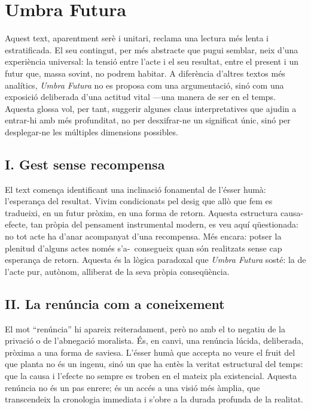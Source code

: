 \section*{Umbra Futura}

\noindent
Aquest text, aparentment serè i unitari, reclama una lectura més lenta i estratificada. El seu contingut, per més abstracte que pugui semblar, neix d’una experiència universal: la tensió entre l’acte i el seu resultat, entre el present i un futur que, massa sovint, no podrem habitar. A diferència d’altres textos més analítics, \textit{Umbra Futura} no es proposa com una argumentació, sinó com una exposició deliberada d’una actitud vital —una manera de ser en el temps. Aquesta glossa vol, per tant, suggerir algunes claus interpretatives que ajudin a entrar-hi amb més profunditat, no per desxifrar-ne un significat únic, sinó per desplegar-ne les múltiples dimensions possibles.

\subsection*{I. Gest sense recompensa}

\noindent
El text comença identificant una inclinació fonamental de l’ésser humà: l’esperança del resultat. Vivim condicionats pel desig que allò que fem es tradueixi, en un futur pròxim, en una forma de retorn. Aquesta estructura causa-efecte, tan pròpia del pensament instrumental modern, es veu aquí qüestionada: no tot acte ha d’anar acompanyat d’una recompensa. Més encara: potser la plenitud d’alguns actes només s’a-\ consegueix quan són realitzats sense cap esperança de retorn. Aquesta és la lògica paradoxal que \textit{Umbra Futura} sosté: la de l’acte pur, autònom, alliberat de la seva pròpia conseqüència.

\subsection*{II. La renúncia com a coneixement}

\noindent
El mot “renúncia” hi apareix reiteradament, però no amb el to negatiu de la privació o de l’abnegació moralista. És, en canvi, una renúncia lúcida, deliberada, pròxima a una forma de saviesa. L’ésser humà que accepta no veure el fruit del que planta no és un ingenu, sinó un que ha entès la veritat estructural del temps: que la causa i l’efecte no sempre es troben en el mateix pla existencial. Aquesta renúncia no és un pas enrere; és un accés a una visió més àmplia, que transcendeix la cronologia immediata i s’obre a la durada profunda de la realitat.

